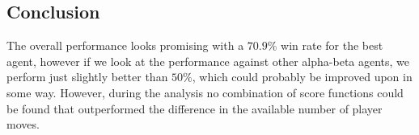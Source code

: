 \documentclass{article}
\begin{document}
\subsection{Conclusion}
The overall performance looks promising with a $70.9\%$ win rate for the best agent,
however if we look at the performance against other alpha-beta agents, we perform
just slightly better than $50\%$, which could probably be improved upon in some way.
However, during the analysis no combination of score functions could be found that
outperformed the difference in the available number of player moves.
\end{document}
